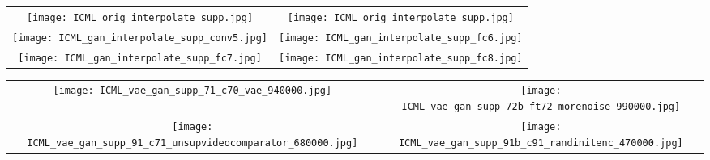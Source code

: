 \documentclass{article}
\newcommand{\conv}{\textsc{conv}}
\newcommand{\fc}{\textsc{fc}}
\begin{document}
\begin{figure*}
\begin{center}
\setlength{\tabcolsep}{0.1cm}
\begin{tabular}{cc}
\texttt{[image: ICML\_orig\_interpolate\_supp.jpg]} &
\texttt{[image: ICML\_orig\_interpolate\_supp.jpg]} \\
\texttt{[image: ICML\_gan\_interpolate\_supp\_conv5.jpg]} &
\texttt{[image: ICML\_gan\_interpolate\_supp\_fc6.jpg]} \\
\texttt{[image: ICML\_gan\_interpolate\_supp\_fc7.jpg]} &
\texttt{[image: ICML\_gan\_interpolate\_supp\_fc8.jpg]}
\end{tabular}
\end{center}
\caption{Interpolation in feature spaces at different layers of AlexNet.
\textbf{Topmost:} input images,
\textbf{Top left:} \conv5,
\textbf{Top right:} \fc6,
\textbf{Bottom left:} \fc7,
\textbf{Bottom right:} \fc8.}
\label{fig:interpol}
\end{figure*}

\begin{figure*}
\begin{center}
\setlength{\tabcolsep}{0.1cm}
\begin{tabular}{cc}
\texttt{[image: ICML\_vae\_gan\_supp\_71\_c70\_vae\_940000.jpg]} &
\texttt{[image: ICML\_vae\_gan\_supp\_72b\_ft72\_morenoise\_990000.jpg]} \\
\texttt{[image: ICML\_vae\_gan\_supp\_91\_c71\_unsupvideocomparator\_680000.jpg]} &
\texttt{[image: ICML\_vae\_gan\_supp\_91b\_c91\_randinitenc\_470000.jpg]}
\end{tabular}
\end{center}
\caption{Samples from VAE with our approach, with different comparators.
\textbf{Top left:} AlexNet \conv5 comparator,
\textbf{Top right:} AlexNet \fc6 comparator,
\textbf{Bottom left:} VideoNet \conv5 comparator,
\textbf{Bottom right:} VideoNet \conv5 comparator with randomly initialized encoder.}
\label{fig:vae_samples_supp}
\end{figure*}
\end{document}
